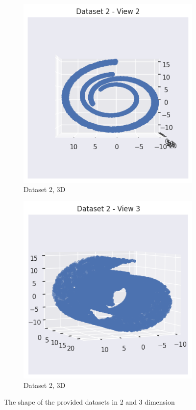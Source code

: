 \documentclass[12pt]{article}
\begin{document}
\begin{figure}[h]
\begin{subfigure}{0.3\textwidth}
      \includegraphics[width=\linewidth]{00.png}
      \caption{Dataset 2, 3D}
      \label{fig:provided_data_2}
    \end{subfigure}%
    \hfill
    \begin{subfigure}{0.3\textwidth}
      \centering
      \includegraphics[width=\linewidth]{000.png}
      \caption{Dataset 2, 3D}
      \label{fig:provided_data_3}
    \end{subfigure}
    \caption{The shape of the provided datasets in 2 and 3 dimension}
    \label{fig:provided_data}
\end{figure}
\end{document}
